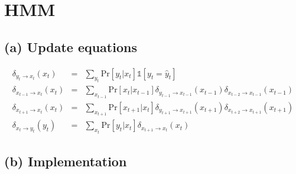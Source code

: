 \documentclass[a4paper]{article}
\begin{document}
\section{HMM}

\subsection{(a) Update equations}

\begin{align*}
\delta_{y_t \rightarrow x_t}(x_t) &=& \sum_{y_t} \mathrm{Pr}\left[ y_t | x_t \right] 
\mathds{1} \left[y_t = \hat{y}_t\right] \\
\delta_{x_{t - 1} \rightarrow x_t}(x_t) &=& \sum_{x_{t - 1}} \mathrm{Pr}\left[ x_t | x_{t - 1} \right] 
\delta_{y_{t-1} \rightarrow x_{t - 1}}(x_{t-1}) \delta_{x_{t - 2} \rightarrow x_{t - 1}}(x_{t - 1}) \\
\delta_{x_{t + 1} \rightarrow x_{t}}(x_t) &=& \sum_{x_{t + 1}} \mathrm{Pr}\left[ x_{t + 1} | x_t \right]
\delta_{y_{t + 1} \rightarrow x_{t + 1}}(x_{t + 1}) \delta_{x_{t + 2} \rightarrow x_{t + 1}}(x_{t + 1}) \\
\delta_{x_t \rightarrow y_t}(y_t) &=& \sum_{x_t} \mathrm{Pr} \left[ y_t | x_t \right] 
\delta_{x_{t + 1} \rightarrow x_t}(x_t)
\end{align*}


\subsection{(b) Implementation}
\end{document}
